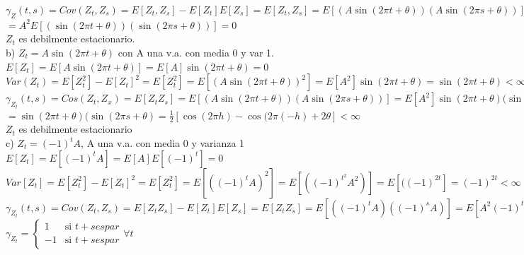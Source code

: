 \documentclass{article}
\begin{document}
$\gamma _Z (t,s) = Cov (Z_t, Z_s) = E[Z_t, Z_s] - E[Z_t]E[Z_s] = E[Z_t, Z_s] = E[(A \sin(2 \pi t + \theta))(A \sin(2 \pi s + \theta))]$\\


$= A^2 E[(\sin(2 \pi t + \theta))(\sin(2 \pi s + \theta))]=0$\\


\therefore $Z_t$ es debilmente estacionario.\\


b) $Z_t = A \sin(2 \pi t + \theta)$  con  A  una  v.a. con media 0 y var  1.\\


$E[Z_t]=E[A \sin(2 \pi t + \theta)]= E[A] \sin(2 \pi t + \theta)  =  0$\\

$Var(Z_t) = E[Z_t^2]-E[Z_t]^2 = E[Z_t^2] = E[(A \sin(2 \pi t + \theta))^2] = E[A^2] \sin(2 \pi t + \theta)=\sin(2 \pi t + \theta) <\infty $\\

$\gamma_ {Z_t} (t,s) = Cos(Z_t,Z_x)= E[Z_t Z_s]= E[(A \sin(2 \pi t + \theta))(A \sin(2 \pi s + \theta))]= E[A^2] \sin(2 \pi t + \theta)(\sin(2 \pi s + \theta)$\\


$= \sin(2 \pi t + \theta)(\sin(2 \pi s + \theta) = \frac{1}{2} [\cos (2 \pi h)-\cos (2 \pi (-h) +2 \theta] < \infty$\\

$Z_t$ es debilmente estacionario \\


c) $Z_t = (-1)^t A $, A una v.a. con media 0 y varianza 1 \\


$E[Z_t] = E[(-1)^t A] = E[A] E[(-1)^t] =0 $\\


$Var[Z_t] =E[Z_t ^2] -E[Z_t]^2 = E[Z_t ^2] = E[((-1)^t A)^2] = E[((-1)^{t^2} A^2)] = E[((-1)^{2t}] = (-1)^{2t} < \infty $\\


$\gamma_{Z_t} (t,s) = Cov(Z_t,Z_s) = E[Z_t Z_s] - E[Z_t]E[Z_s]= E[Z_t Z_s]=E[((-1)^t A)((-1)^s A)]=E[A^2 (-1)^{t+s}] = E[A^2]E[(-1)^{t+s}]$\\

$ \gamma_{Z_t} = \left \{\begin{array}{rl}  1 & \text{si } t+s es par \\   -1 & \text{si }  t+s es par \end{array} \right.  \forall t $\\
\end{document}
